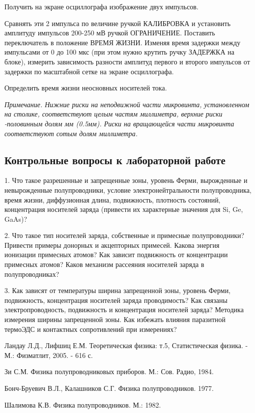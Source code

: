 \documentclass[a4paper,12pt]{article}
\begin{document}
Получить на экране осциллографа изображение двух импульсов.

Сравнять эти 2 импульса по величине ручкой КАЛИБРОВКА и установить амплитуду импульсов 200-250 мВ ручкой ОГРАНИЧЕНИЕ. Поставить переключатель в положение ВРЕМЯ ЖИЗНИ. Изменяя время задержки между импульсами от 0 до 100 мкс (при этом нужно крутить ручку ЗАДЕРЖКА на блоке), измерить зависимость разности амплитуд первого и второго импульсов от задержки по масштабной сетке на экране осциллографа.

Определить время жизни неосновных носителей тока.

\textit{Примечание. Нижние риски на неподвижной части микровинта, установленном на столике, соответствуют целым частям миллиметра, верхние риски -половинным долям мм (0.5мм). Риски на вращающейся части микровинта соответствуют сотым долям миллиметра.}

\subsection{Контрольные вопросы к лабораторной работе}

1. Что такое разрешенные и запрещенные зоны, уровень Ферми, вырожденные и невырожденные полупроводники, условие электронейтральности полупроводника, время жизни, диффузионная длина, подвижность, плотность состояний, концентрация носителей заряда (привести их характерные значения для Si, Ge, GaAs)?

2.    Что такое тип носителей заряда, собственные и примесные полупроводники? Привести примеры донорных и акцепторных примесей. Какова энергия ионизации примесных атомов? Как зависит подвижность от концентрации примесных атомов? Каков механизм рассеяния носителей заряда в полупроводниках?

3.    Как зависят от температуры ширина запрещенной зоны, уровень Ферми, подвижность, концентрация носителей заряда проводимость? Как связаны электропроводность, подвижность и концентрация носителей заряда? Методика измерения ширины запрещенной зоны. Как избежать влияния паразитной термоЭДС и контактных сопротивлений при измерениях?

\begin{thebibliography}{99}
 Ландау Л.Д., Лифшиц Е.М. Теоретическая физика: т.5, Статистическая физика. - М.: Физматлит, 2005. - 616 с.

 Зи С.М. Физика полупроводниковых приборов. М.: Сов. Радио, 1984.

   Бонч-Бруевич В.Л., Калашников С.Г. Физика полупроводников. 1977.

    Шалимова К.В. Физика полупроводников. М.: 1982.
\end{thebibliography}
\end{document}
